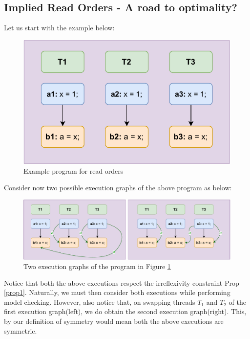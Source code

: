 \subsection{Implied Read Orders - A road to optimality?}

    Let us start with the example below:
    \begin{figure}
        \centering
        \includegraphics{ReadOrder_Prog(1).pdf}
        \caption{Example program for read orders}
        \label{read_ord:ex1}
    \end{figure}

    Consider now two possible execution graphs of the above program as below:
    \begin{figure}
        \centering
        \includegraphics{ReadOrder_Exec(1).pdf}
        \caption{Two execution graphs of the program in Figure \ref{read_ord:ex1}}
        \label{read_ord:exec_ex1}
    \end{figure}

    Notice that both the above executions respect the irreflexivity constraint Prop \ref{prop1}.
    Naturally, we must then consider both executions while performing model checking.
    However, also notice that, on swapping threads $T_1$ and $T_2$ of the first execution graph(left), we do obtain the second execution graph(right).
    This, by our definition of symmetry would mean both the above executions are symmetric. 

